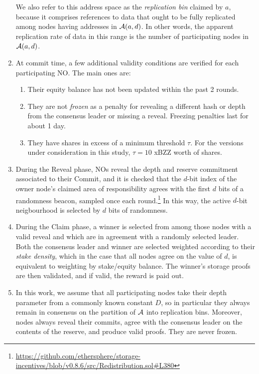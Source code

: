 \begin{enumerate}
    We also refer to this address space as the \emph{replication bin} claimed by $a$, because it comprises references to data that ought to be fully replicated among nodes having addresses in $\mathcal{A}(a,d)$.
    In other words, the apparent replication rate of data in this range is the number of participating nodes in $\mathcal{A}(a,d)$.

    
  \item
    At commit time, a few additional validity conditions are verified for each participating NO.
    The main ones are:
    \begin{enumerate}
      \item Their equity balance has not been updated within the past 2 rounds.
      \item 
        They are not \emph{frozen} as a penalty for revealing a different hash or depth from the consensus leader or missing a reveal. 
        Freezing penalties last for about 1 day.
      \item 
        They have shares in excess of a minimum threshold $\tau$. For the versions under consideration in this study, $\tau=10$ xBZZ worth of shares.
    \end{enumerate}

  \item
    During the Reveal phase, NOs reveal the depth and reserve commitment associated to their Commit, and it is checked that the $d$-bit index of the owner node's claimed area of responsibility agrees with the first $d$ bits of a randomness beacon, sampled once each round.\footnote{\url{https://github.com/ethersphere/storage-incentives/blob/v0.8.6/src/Redistribution.sol\#L380}}
    In this way, the active $d$-bit neigbourhood is selected by $d$ bits of randomness.

  \item    
    During the Claim phase, a winner is selected from among those nodes with a valid reveal and which are in agreement with a randomly selected leader.
    Both the consensus leader and winner are selected weighted according to their \emph{stake density}, which in the case that all nodes agree on the value of $d$, is equivalent to weighting by stake/equity balance.
    The winner's storage proofs are then validated, and if valid, the reward is paid out.

  \item
    In this work, we assume that all participating nodes take their depth parameter from a commonly known constant $D$, so in particular they always remain in consensus on the partition of $\mathcal{A}$ into replication bins.
    Moreover, nodes always reveal their commits, agree with the consensus leader on the contents of the reserve, and produce valid proofs.
    They are never frozen.


\end{enumerate}

